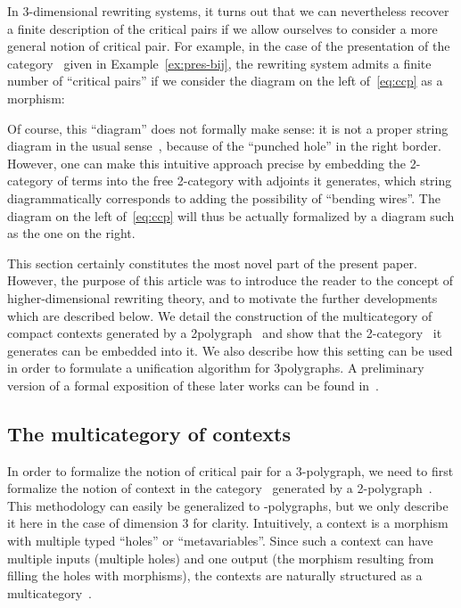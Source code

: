 \documentclass{LMCS}
\begin{document}
In 3-dimensional rewriting systems, it turns out that we can nevertheless
recover a finite description of the critical pairs if we allow ourselves to
consider a more general notion of critical pair. For example, in the case of the
presentation of the category~ given in Example~\ref{ex:pres-bij}, the
rewriting system admits a finite number of ``critical pairs'' if we consider the
diagram on the left of~\eqref{eq:ccp} as a morphism:

Of course, this ``diagram'' does not formally make sense: it is not a proper
string diagram in the usual sense~\cite{joyal-street:geometry-tensor-calculus},
because of the ``punched hole'' in the right border. However, one can make this
intuitive approach precise by embedding the 2-category of terms into the free
2-category with adjoints it generates, which string diagrammatically corresponds
to adding the possibility of ``bending wires''. The diagram on the left
of~\eqref{eq:ccp} will thus be actually formalized by a diagram such as the one
on the right.

This section certainly constitutes the most novel part of the present
paper. However, the purpose of this article was to introduce the reader to the
concept of higher-dimensional rewriting theory, and to motivate the further
developments which are described below. We detail the construction of the
multicategory of compact contexts generated by a 2\nbd{}polygraph~ and show
that the 2-category~ it generates can be embedded into it. We also describe
how this setting can be used in order to formulate a unification algorithm for
3\nbd{}polygraphs. A preliminary version of a formal exposition of these later
works can be found in~\cite{mimram:2-cp}.


\subsection{The multicategory of contexts}
\label{sec:contexts}
In order to formalize the notion of critical pair for a 3-polygraph, we need to
first formalize the notion of context in the category~ generated by a
2-polygraph~. This methodology can easily be generalized to -polygraphs,
but we only describe it here in the case of dimension 3 for
clarity. Intuitively, a context is a morphism with multiple typed ``holes'' or
``metavariables''. Since such a context can have multiple inputs (\ie multiple
holes) and one output (the morphism resulting from filling the holes with
morphisms), the contexts are naturally structured as a
multicategory~\cite{leinster:higher-operads}.
\end{document}
